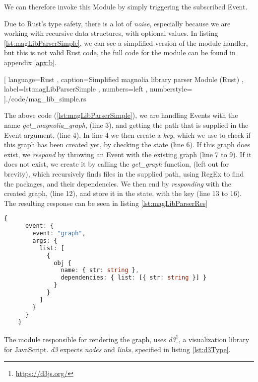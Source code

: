 We can therefore invoke this Module by simply triggering the subscribed Event.

Due to Rust's type safety, there is a lot of \textit{noise}, especially because
we are working with recursive data structures, with optional values. In listing
\ref{lst:magLibParserSimple}, we can see a simplified version of the module
handler, but this is not valid Rust code, the full code for the module can be
found in appendix \ref{apx:b}.

\begin{code}[H]
  
    [ language=Rust
    , caption={Simplified magnolia library parser Module (Rust)}
    , label=lst:magLibParserSimple
    , numbers=left
    , numberstyle=\tiny\color{gray}
    ]{./code/mag\_lib\_simple.rs}
\end{code}

The above code (\ref{lst:magLibParserSimple}), we are handling Events with the name
\textit{get\_magnolia\_graph}, (line 3), and getting the path that is supplied in
the Event argument, (line 4). In line 4 we then create a \textit{key}, which we
use to check if this graph has been created yet, by checking the state (line 6).
If this graph does exist, we \textit{respond} by throwing an Event with the
existing graph (line 7 to 9). If it does not exist, we create it by calling the
\textit{get\_graph} function, (left out for brevity), which recursively finds
files in the supplied path, using RegEx to find the packages, and their
dependencies. We then end by \textit{responding} with the created graph,
(line 12), and store it in the state, with the key (line 13 to 16). The
resulting response can be seen in listing \ref{lst:magLibParserRes}

\begin{code}[H]
  \begin{lstlisting}[language = TypeScript, label=lst:magLibParserRes, caption={Magnolia library parser response (TypeScript)}]
    {
      event: {
        event: "graph",
        args: {
          list: [
            {
              obj {
                name: { str: string },
                dependencies: { list: [{ str: string }] }
              }
            }
          ]
        }
      }
    }
  \end{lstlisting}
\end{code}

The module responsible for rendering the graph, uses
\textit{d3}\footnote{\url{https://d3js.org/}}, a visualization library for
JavaScript. \textit{d3} expects \textit{nodes} and \textit{links}, specified in
listing \ref{lst:d3Type}.

